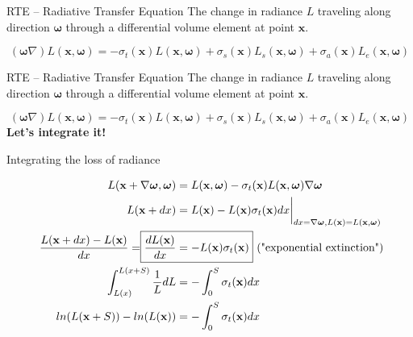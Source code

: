 \documentclass[
  english,            %
  aspectratio=169,    %
]{tumbeamer}
\newcommand\bx[0]{\textbf{x}}
\newcommand\bomega[0]{\boldsymbol{\omega}}
\begin{document}
\begin{frame}{RTE -- Radiative Transfer Equation}
    The change in radiance $L$ traveling along direction $\boldsymbol{\omega}$
    through a differential volume element at point $\boldsymbol{x}$.
    \begin{figure}[ht]
        \centering
        \scalebox{.7}{
            
        }
    \end{figure}
    \begin{equation} 
        \label{eq:RTE}
        (\bomega \nabla)L(\bx,\bomega) =
        - \sigma_t(\bx)L(\bx,\bomega)
        + \sigma_s(\bx)L_s(\bx,\bomega) + \sigma_a(\bx)L_e(\bx,\bomega)
    \end{equation}
\end{frame}

\begin{frame}{RTE -- Radiative Transfer Equation}
    The change in radiance $L$ traveling along direction $\boldsymbol{\omega}$
    through a differential volume element at point $\boldsymbol{x}$.
    \begin{figure}[ht]
        \centering
        \scalebox{.7}{
            
        }
    \end{figure}
    \begin{equation} 
        \label{eq:RTE}
        (\bomega \nabla)L(\bx,\bomega) =
        - \sigma_t(\bx)L(\bx,\bomega)
        + \sigma_s(\bx)L_s(\bx,\bomega) + \sigma_a(\bx)L_e(\bx,\bomega)
    \end{equation}
    \centering
    \vfill
    \textbf{Let's integrate it!}
\end{frame}

\begin{frame}{Integrating the loss of radiance}
\begin{figure}[ht]
    \centering
    \scalebox{.6}{
        
    }
    \begin{align}
    \begin{aligned}
        L(\bx + \nabla\bomega,\bomega) &= 
            L(\bx,\bomega) - \sigma_t(\bx)L(\bx,\bomega)\nabla\bomega \\ 
        L(\bx + dx) &= 
            L(\bx) - L(\bx)\sigma_t(\bx)dx\bigg|_{dx=\nabla\bomega,
            L(\bx)=L(\bx, \bomega)} \\
        \frac{L(\bx + dx) - L(\bx)}{dx} = \Aboxed{\frac{dL(\bx)}{dx} &=
        -L(\bx)\sigma_t(\bx)} \text{ ("exponential extinction")}\\
        \int_{L(x)}^{L(x+S)} \frac{1}{L} dL &= -\int_0^S \sigma_t(\bx)dx\\
        ln(L(\bx+S)) - ln(L(\bx)) &= - \int_0^S \sigma_t(\bx) dx
    \end{aligned}
    \end{align}
\end{figure}
\end{frame}
\end{document}
